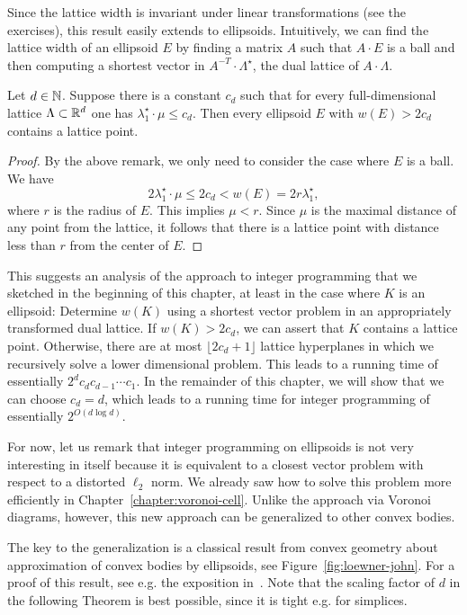 Since the lattice width is invariant under linear transformations (see the exercises),
this result easily extends to ellipsoids.
Intuitively, we can find the lattice width of an ellipsoid $E$
by finding a matrix $A$ such that $A \cdot E$ is a ball
and then computing a shortest vector in $A^{-T} \cdot \Lambda^\star$,
the dual lattice of $A \cdot \Lambda$.

\begin{theorem}
  \label{thm:flatness-ellipsoids}
  Let $d \in \mathbb{N}$.
  Suppose there is a constant $c_d$ such that for every full-dimensional lattice $\Lambda \subset \mathbb{R}^d$
  one has $\lambda_1^\star \cdot \mu \leq c_d$.
  Then every ellipsoid $E$ with $w(E) > 2 c_d$ contains a lattice point.
\end{theorem}
\begin{proof}
  By the above remark, we only need to consider the case where $E$ is a ball.
  We have
  \[
    2 \lambda_1^\star \cdot \mu \leq 2 c_d < w(E) = 2r \lambda_1^\star,
  \]
  where $r$ is the radius of $E$.
  This implies $\mu < r$.
  Since $\mu$ is the maximal distance of any point from the lattice,
  it follows that there is a lattice point with distance less than $r$ from the center of $E$.
\end{proof}

This suggests an analysis of the approach to integer programming
that we sketched in the beginning of this chapter,
at least in the case where $K$ is an ellipsoid:
Determine $w(K)$ using a shortest vector problem in an appropriately transformed dual lattice.
If $w(K) > 2c_d$, we can assert that $K$ contains a lattice point.
Otherwise, there are at most $\lfloor 2c_d + 1 \rfloor$
lattice hyperplanes in which we recursively solve a lower dimensional problem.
This leads to a running time of essentially $2^d c_d c_{d-1} \cdots c_1$.
In the remainder of this chapter,
we will show that we can choose $c_d = d$,
which leads to a running time for integer programming of essentially $2^{O(d \log d)}$.

For now,
let us remark that integer programming on ellipsoids is not very interesting in itself
because it is equivalent to a closest vector problem
with respect to a distorted $\ell_2$ norm.
We already saw how to solve this problem more efficiently in Chapter~\ref{chapter:voronoi-cell}.
Unlike the approach via Voronoi diagrams, however,
this new approach can be generalized to other convex bodies.

The key to the generalization is a classical result from convex geometry
about approximation of convex bodies by ellipsoids, see Figure~\ref{fig:loewner-john}.
For a proof of this result, see e.g. the exposition in~\cite{MR1491097}.
Note that the scaling factor of $d$ in the following Theorem is best possible,
since it is tight e.g. for simplices.

